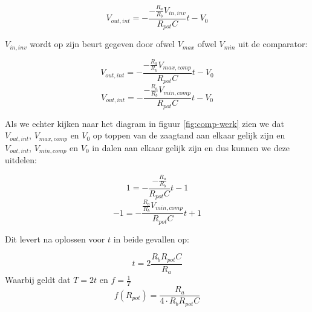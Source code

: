 \documentclass{report}
\begin{document}
$$V_{out,int} = -\frac{-\frac{R_{a}}{R_{b}}V_{in,inv}}{R_{pot}C} t - V_{0}$$

\noindent
$V_{in,inv}$ wordt op zijn beurt gegeven door ofwel $V_{max}$ ofwel $V_{min}$ uit de comparator:

$$V_{out,int} = -\frac{-\frac{R_{a}}{R_{b}}V_{max,comp}}{R_{pot}C} t - V_{0}$$
$$V_{out,int} = -\frac{-\frac{R_{a}}{R_{b}}V_{min,comp}}{R_{pot}C} t - V_{0}$$

\noindent
Als we echter kijken naar het diagram in figuur \ref{fig:comp-werk} zien we dat $V_{out,int}$, $V_{max,comp}$ en $V_{0}$ op toppen van de zaagtand aan elkaar gelijk zijn en $V_{out,int}$, $V_{min,comp}$ en $V_{0}$ in dalen aan elkaar gelijk zijn en dus kunnen we deze uitdelen:

$$1 = -\frac{-\frac{R_{a}}{R_{b}}}{R_{pot}C} t - 1$$
$$-1 = -\frac{\frac{R_{a}}{R_{b}}V_{min,comp}}{R_{pot}C} t + 1$$

\noindent
Dit levert na oplossen voor $t$ in beide gevallen op:

\begin{equation}
	t = 2\frac{R_{b}R_{pot}C}{R_{a}}
\end{equation}
\noindent
Waarbij geldt dat $T=2t$ en $f=\frac{1}{T}$
\begin{equation}
\label{eq:freqOscillator}
	f(R_{pot}) = \frac{R_a}{4 \cdot R_{b}R_{pot}C}
\end{equation}
\end{document}
